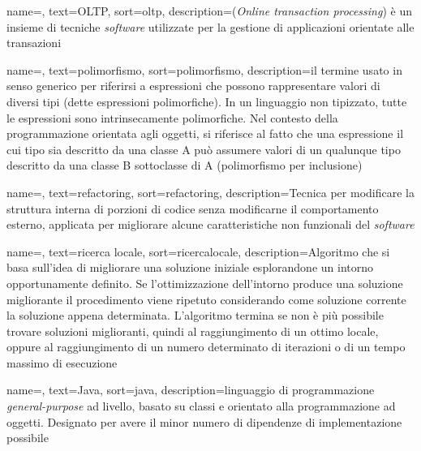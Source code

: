 {
    name=,
    text=OLTP,
    sort=oltp,
    description={(\textit{Online transaction processing}) è un insieme di tecniche \textit{software} utilizzate per
    la gestione di applicazioni orientate alle transazioni \cite{site:wiki}}
}

{
    name=,
    text=polimorfismo,
    sort=polimorfismo,
    description={il termine usato in senso generico
    per riferirsi a espressioni che possono rappresentare valori di diversi tipi (dette
    espressioni polimorfiche). In un linguaggio non tipizzato, tutte le espressioni
    sono intrinsecamente polimorfiche. Nel contesto della programmazione orientata
    agli oggetti, si riferisce al fatto che una espressione il cui tipo sia descritto da
    una classe A può assumere valori di un qualunque tipo descritto da una classe B
    sottoclasse di A (polimorfismo per inclusione) \cite{site:wiki}}
}

{
    name=,
    text=refactoring,
    sort=refactoring,
    description={Tecnica per modificare la struttura interna di porzioni di codice
    senza modificarne il comportamento esterno, applicata per migliorare alcune
    caratteristiche non funzionali del \textit{software} \cite{Addison-Wesley:software-engineering}}
}

{
    name=,
    text=ricerca locale,
    sort=ricercalocale,
    description={Algoritmo che si basa sull’idea di migliorare
    una soluzione iniziale esplorandone un intorno
    opportunamente definito. Se l’ottimizzazione
    dell’intorno produce una soluzione migliorante
    il procedimento viene ripetuto
    considerando come soluzione corrente la soluzione
    appena determinata. L’algoritmo termina se non è più
    possibile trovare soluzioni miglioranti, quindi al
    raggiungimento di un ottimo locale, oppure al
    raggiungimento di un numero
    determinato di iterazioni o di un tempo massimo di esecuzione \cite{site:dispense-de-giovanni}}
}

{
    name=,
    text=Java,
    sort=java,
    description={linguaggio di programmazione
    \textit{general-purpose} ad livello, basato su classi
    e orientato alla programmazione ad oggetti. Designato
    per avere il minor numero di dipendenze di implementazione
    possibile \cite{site:wiki}}
}

